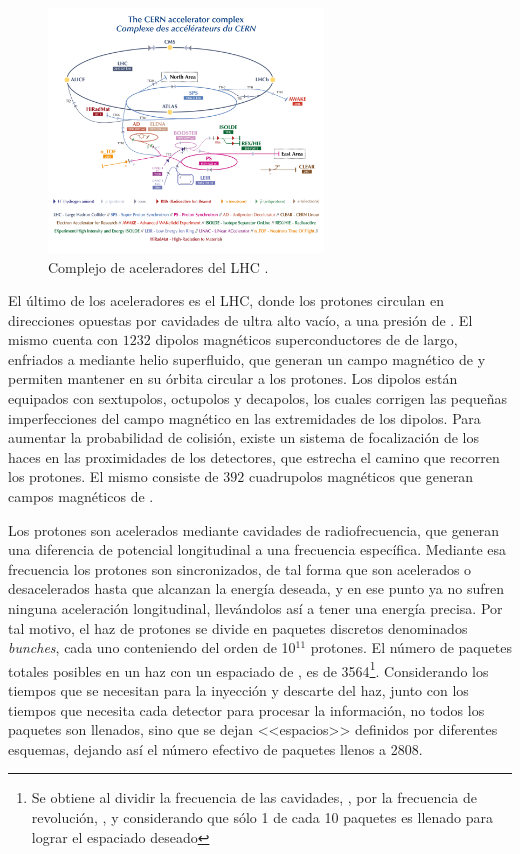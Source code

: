 \begin{figure}
  \centering
  \includegraphics[width=0.65\textwidth]{images/lhc/LHC_complex.png}
  \caption{Complejo de aceleradores del LHC \cite{Lopienska:2800984}.}
  \label{fig:LHC_complex}
\end{figure}

El último de los aceleradores es el LHC, donde los protones circulan en direcciones opuestas por cavidades de ultra alto vacío, a una presión de . El mismo cuenta con $1232$ dipolos magnéticos superconductores de  de largo, enfriados a  mediante helio superfluido, que generan un campo magnético de  y permiten mantener en su órbita circular a los protones. Los dipolos están equipados con sextupolos, octupolos y decapolos, los cuales corrigen las pequeñas imperfecciones del campo magnético en las extremidades de los dipolos. Para aumentar la probabilidad de colisión, existe un sistema de focalización de los haces en las proximidades de los detectores, que estrecha el camino que recorren los protones. El mismo consiste de $392$ cuadrupolos magnéticos que generan campos magnéticos de .

Los protones son acelerados mediante cavidades de radiofrecuencia, que generan una diferencia de potencial longitudinal a una frecuencia específica. Mediante esa frecuencia los protones son sincronizados, de tal forma que son acelerados o desacelerados hasta que alcanzan la energía deseada, y en ese punto ya no sufren ninguna aceleración longitudinal, llevándolos así a tener una energía precisa. Por tal motivo, el haz de protones se divide en paquetes discretos denominados \textit{bunches}, cada uno conteniendo del orden de 10$^{11}$ protones. El número de paquetes totales posibles en un haz con un espaciado de , es de 3564\footnote{Se obtiene al dividir la frecuencia de las cavidades, , por la frecuencia de revolución, , y considerando que sólo 1 de cada 10 paquetes es llenado para lograr el espaciado deseado}. Considerando los tiempos que se necesitan para la inyección y descarte del haz, junto con los tiempos que necesita cada detector para procesar la información, no todos los paquetes son llenados, sino que se dejan <<espacios>> definidos por diferentes esquemas, dejando así el número efectivo de paquetes llenos a 2808.

